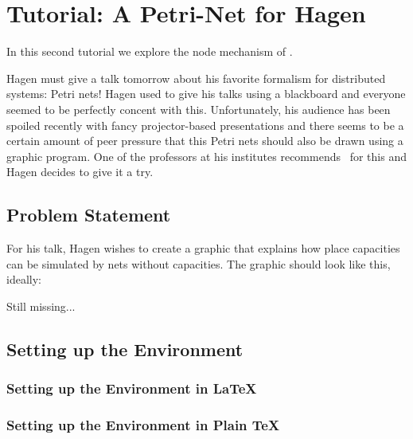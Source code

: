 \section{Tutorial: A Petri-Net for Hagen}

In this second tutorial we explore the node mechanism of
\tikzname.

Hagen must give a talk tomorrow about his favorite formalism for
distributed systems: Petri nets! Hagen used to give his talks using a
blackboard and everyone seemed to be perfectly concent with
this. Unfortunately, his audience has been spoiled recently with fancy
projector-based presentations and there seems to be a certain amount
of peer pressure that this Petri nets should also be drawn using a
graphic program. One of the professors at his institutes recommends
\tikzname\ for this and Hagen decides to give it a try.


\subsection{Problem Statement}

For his talk, Hagen wishes to create a graphic that explains how
place capacities can be simulated by nets without capacities. The
graphic should look like this, ideally:


Still missing...


\subsection{Setting up the Environment}

\subsubsection{Setting up the Environment in \LaTeX}

\subsubsection{Setting up the Environment in Plain \TeX}


